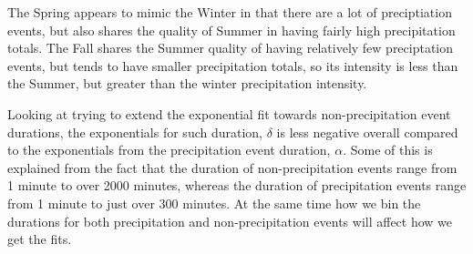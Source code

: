 \documentclass[11pt]{report}
\begin{document}
The Spring appears to mimic the Winter in that there are a lot of
preciptiation events, but also shares the quality of Summer in having
fairly high precipitation totals. The Fall shares the Summer quality
of having relatively few preciptation events, but tends to have
smaller precipitation totals, so its intensity is less than the
Summer, but greater than the winter precipitation intensity.
 

Looking at trying to extend the exponential fit towards non-precipitation event durations, the exponentials for such duration, $\delta$ is less negative overall compared to the exponentials from the precipitation event duration, $\alpha$. Some of this is explained from the fact that the duration of non-precipitation events range from 1 minute to over 2000 minutes, whereas the duration of precipitation events range from 1 minute to just over 300 minutes. At the same time how we bin the durations for both precipitation and non-precipitation events will affect how we get the fits. 
\end{document}
